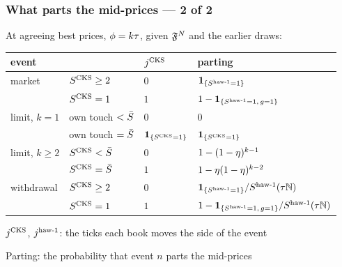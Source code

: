 \begin{frame}
  \frametitle{What parts the mid-prices --- 2 of 2}
\begin{prop}
\label{prop.partingProbability}
 At agreeing best prices, $\phi = k\tau$, given
 $\mathfrak{F}^{N}$ and the earlier draws:\par\smallskip
 {\footnotesize\hfill\begin{tabular}{@{}llll@{}}
  \toprule
  event & & $j^{\mathrm{CKS}}$ & parting \\
  \midrule
  market & $S^{\mathrm{CKS}} \geq 2$ & $0$ & $\mathbf{1}_{\lbrace {S^{\mathrm{haw}\text{-}1} = 1} \rbrace}$ \\
   & $S^{\mathrm{CKS}} = 1$ & $1$ & $1 - \mathbf{1}_{\lbrace {S^{\mathrm{haw}\text{-}1} = 1, \, g = 1} \rbrace}$ \\
  limit, $k = 1$ & own touch $< \bar{S}$ & $0$ & $0$ \\
   & own touch $= \bar{S}$ & $\mathbf{1}_{\lbrace {S^{\mathrm{CKS}} = 1} \rbrace}$
   & $\mathbf{1}_{\lbrace {S^{\mathrm{CKS}} = 1} \rbrace}$ \\
  limit, $k \geq 2$ & $S^{\mathrm{CKS}} < \bar{S}$ & $0$
   & $1 - (1-\eta)^{k-1}$ \\
   & $S^{\mathrm{CKS}} = \bar{S}$ & $1$
   & $1 - \eta(1-\eta)^{k-2}$ \\
  withdrawal & $S^{\mathrm{CKS}} \geq 2$ & $0$
   & $\mathbf{1}_{\lbrace {S^{\mathrm{haw}\text{-}1} = 1} \rbrace}/S^{\mathrm{haw}\text{-}1}(\tau\mathbb{N})$ \\
   & $S^{\mathrm{CKS}} = 1$ & $1$
   & $1 - \mathbf{1}_{\lbrace {S^{\mathrm{haw}\text{-}1} = 1, \, g = 1} \rbrace}/S^{\mathrm{haw}\text{-}1}(\tau\mathbb{N})$ \\
  \bottomrule
 \end{tabular}\hfill\null\par}
\end{prop}

$j^{\mathrm{CKS}}$, $j^{\mathrm{haw}\text{-}1}$: the ticks each book moves the side of the event

Parting: the probability that event $n$ parts the mid-prices


\end{frame}
